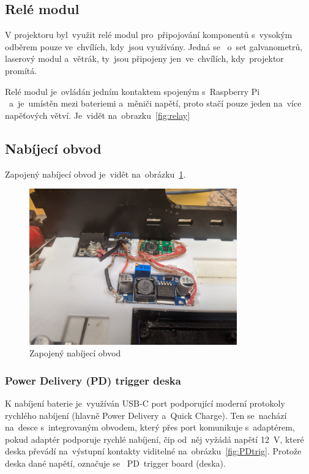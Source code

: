 \subsection{Relé modul}
V projektoru byl~využit relé modul pro~připojování komponentů s~vysokým odběrem pouze ve~chvílích, kdy~jsou využívány. Jedná se ~o~set galvanometrů, laserový modul a~větrák, ty~jsou připojeny jen~ve~chvílích, kdy~projektor promítá.

Relé modul je~ovládán jedním kontaktem spojeným s~Raspberry Pi ~a~je~umístěn mezi bateriemi a~měniči napětí, proto stačí pouze jeden na~více napěťových větví. Je~vidět na~obrazku~\ref{fig:relay}

\subsection{Nabíjecí obvod}
Zapojený nabíjecí obvod je~vidět na~obrázku~\ref{fig:hw_charging_circuit}.

\begin{figure}[htb]
  \centering
  \includegraphics[width=0.8\textwidth]{img/hw_charging_circuit.jpg}
  \caption{\label{fig:hw_charging_circuit} Zapojený nabíjecí obvod}
\end{figure}

\subsubsection{Power Delivery (PD) trigger deska}
K nabíjení baterie je~využíván USB-C port podporující moderní protokoly rychlého nabíjení (hlavně Power Delivery a~Quick Charge).
Ten se~nachází na~desce s~integrovaným obvodem, který přes port komunikuje s~adaptérem, pokud adaptér podporuje rychlé nabíjení, čip od~něj vyžádá napětí 12~V, které deska převádí na~výstupní kontakty viditelné na~obrázku~\ref{fig:PDtrig}. Protože deska  dané napětí, označuje se ~PD~trigger board (deska).

